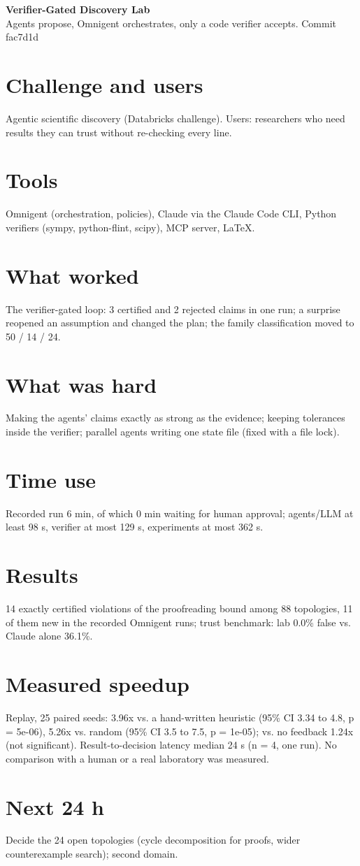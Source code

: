 \documentclass[11pt]{article}
\begin{document}
{\Large\bfseries Verifier-Gated Discovery Lab}\\[2pt]{\small Agents propose, Omnigent orchestrates, only a code verifier accepts. \quad Commit fac7d1d}\par\medskip
\section{Challenge and users}
Agentic scientific discovery (Databricks challenge). Users: researchers who need results they can trust without re-checking every line.\par
\section{Tools}
Omnigent (orchestration, policies), Claude via the Claude Code CLI, Python verifiers (sympy, python-flint, scipy), MCP server, LaTeX.\par
\section{What worked}
The verifier-gated loop: 3 certified and 2 rejected claims in one run; a surprise reopened an assumption and changed the plan; the family classification moved to 50 / 14 / 24.\par
\section{What was hard}
Making the agents' claims exactly as strong as the evidence; keeping tolerances inside the verifier; parallel agents writing one state file (fixed with a file lock).\par
\section{Time use}
Recorded run 6 min, of which 0 min waiting for human approval; agents/LLM at least 98 s, verifier at most 129 s, experiments at most 362 s.\par
\section{Results}
14 exactly certified violations of the proofreading bound among 88 topologies, 11 of them new in the recorded Omnigent runs; trust benchmark: lab 0.0\% false vs. Claude alone 36.1\%.\par
\section{Measured speedup}
Replay, 25 paired seeds: 3.96x vs. a hand-written heuristic (95\% CI 3.34 to 4.8, p = 5e-06), 5.26x vs. random (95\% CI 3.5 to 7.5, p = 1e-05); vs. no feedback 1.24x (not significant). Result-to-decision latency median 24 s (n = 4, one run). No comparison with a human or a real laboratory was measured.\par
\section{Next 24 h}
Decide the 24 open topologies (cycle decomposition for proofs, wider counterexample search); second domain.\par
\end{document}

